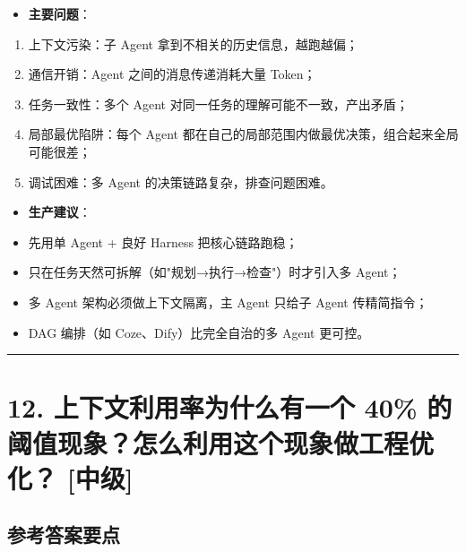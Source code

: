 \documentclass[9pt,a4paper,twocolumn]{ctexart}
\newcommand{\lvzhong}{\usebox{\badgezhongbox}}
\def\lvzhong{[中级]}%
\begin{document}
\begin{itemize}[itemsep=1pt, topsep=2pt]
  \item \textbf{主要问题}：
\end{itemize}
\begin{enumerate}[itemsep=1pt, topsep=2pt]
  \item 上下文污染：子 Agent 拿到不相关的历史信息，越跑越偏；
  \item 通信开销：Agent 之间的消息传递消耗大量 Token；
  \item 任务一致性：多个 Agent 对同一任务的理解可能不一致，产出矛盾；
  \item 局部最优陷阱：每个 Agent 都在自己的局部范围内做最优决策，组合起来全局可能很差；
  \item 调试困难：多 Agent 的决策链路复杂，排查问题困难。
\end{enumerate}
\begin{itemize}[itemsep=1pt, topsep=2pt]
  \item \textbf{生产建议}：
  \item 先用单 Agent + 良好 Harness 把核心链路跑稳；
  \item 只在任务天然可拆解（如"规划→执行→检查"）时才引入多 Agent；
  \item 多 Agent 架构必须做上下文隔离，主 Agent 只给子 Agent 传精简指令；
  \item DAG 编排（如 Coze、Dify）比完全自治的多 Agent 更可控。
\end{itemize}


\vspace{2pt}
\noindent\rule{\columnwidth}{0.3pt}\vspace{2pt}



\section*{12. 上下文利用率为什么有一个 40\% 的阈值现象？怎么利用这个现象做工程优化？ \lvzhong{}}


\subsection*{参考答案要点}
\end{document}
